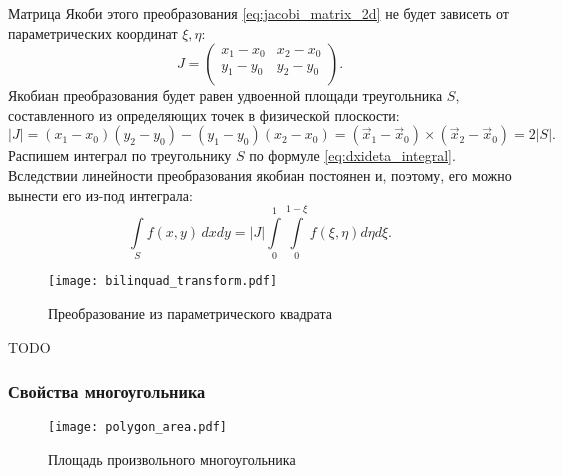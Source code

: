 Матрица Якоби этого преобразования \cref{eq:jacobi_matrix_2d}
не будет зависеть от параметрических координат $\xi, \eta$:
\begin{equation}
\label{eq:lintri_jacobi_matrix}
J = \left(
\begin{array}{cc}
x_1 - x_0 & x_2 - x_0 \\
y_1 - y_0 & y_2 - y_0 \\
\end{array}
\right).
\end{equation}
Якобиан преобразования будет равен удвоенной площади треугольника $S$, составленного из определяющих точек в физической плоскости:
\begin{equation}
\label{eq:lintri_jacobian}
|J| = (x_1 - x_0) (y_2 - y_0) - (y_1 - y_0) (x_2 - x_0) = (\vec x_1 - \vec x_0) \times (\vec x_2 - \vec x_0) = 2 |S|.
\end{equation}
Распишем интеграл по треугольнику $S$ по формуле \cref{eq:dxideta_integral}.
Вследствии линейности преобразования якобиан постоянен и, поэтому, его можно вынести его из-под интеграла:
\begin{equation}
\label{eq:lintri_integral}
\int\limits_{S}f(x, y)\,dxdy = |J|\int\limits_0^1 \int\limits_0^{1-\xi} f(\xi, \eta) d\eta d\xi.
\end{equation}

\label{sec:bilinquad_transform}
\begin{figure}[h!]
\centering
\texttt{[image: bilinquad\_transform.pdf]}
\caption{Преобразование из параметрического квадрата}
\label{fig:bilinquad_transform}
\end{figure}

TODO

\subsubsection{Свойства многоугольника}
\label{sec:polygon_area} 

\begin{figure}[h!]
\centering
\texttt{[image: polygon\_area.pdf]}
\caption{Площадь произвольного многоугольника}
\label{fig:polygon_area}
\end{figure}

